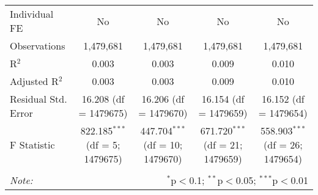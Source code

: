 \documentclass[
]{article}
\begin{document}
\begin{table}[!htbp]
{\begin{tabular}{@{\extracolsep{5pt}}lcccc}
Individual FE & No & No & No & No \\ 
Observations & 1,479,681 & 1,479,681 & 1,479,681 & 1,479,681 \\ 
R$^{2}$ & 0.003 & 0.003 & 0.009 & 0.010 \\ 
Adjusted R$^{2}$ & 0.003 & 0.003 & 0.009 & 0.010 \\ 
Residual Std. Error & 16.208 (df = 1479675) & 16.206 (df = 1479670) & 16.154 (df = 1479659) & 16.152 (df = 1479654) \\ 
F Statistic & 822.185$^{***}$ (df = 5; 1479675) & 447.704$^{***}$ (df = 10; 1479670) & 671.720$^{***}$ (df = 21; 1479659) & 558.903$^{***}$ (df = 26; 1479654) \\ 
\hline 
\hline \\[-1.8ex] 
\textit{Note:}  & \multicolumn{4}{r}{$^{*}$p$<$0.1; $^{**}$p$<$0.05; $^{***}$p$<$0.01} \\ 
\end{tabular}
} 
\end{table} 
\newpage
\end{document}
